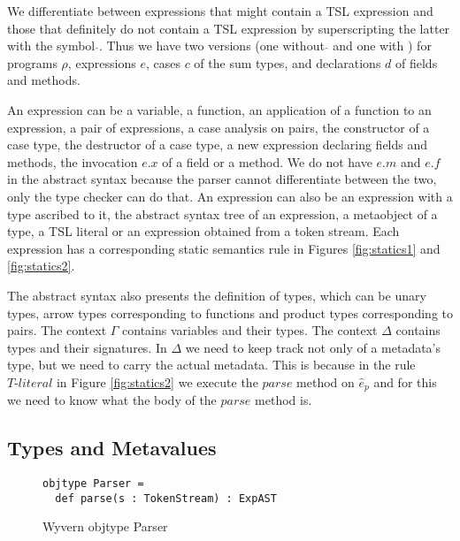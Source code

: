 We differentiate between expressions that might contain a TSL expression and those that definitely do not contain a TSL expression by superscripting the latter with the symbol $\hat{}$. Thus we have two versions (one without $\hat{}$ and one with $\hat{}$) for programs $\rho$,  expressions $e$, cases $c$ of the sum types, and declarations $d$ of fields and methods. 

An expression can be a variable, a function, an application of a function to an expression, a pair of expressions, a case analysis on pairs, the constructor of a case type, the destructor of a case type, a new expression declaring fields and methods, the invocation $e.x$ of a field or a method. We do not have $e.m$ and $e.f$ in the abstract syntax because the parser cannot differentiate between the two, only the type checker can do that. An expression can also be an expression with a type ascribed to it, the abstract syntax tree of an expression, a metaobject of a type, a TSL literal or an expression obtained from a token stream. Each expression has a corresponding static semantics rule in Figures \ref{fig:statics1} and \ref{fig:statics2}. 

The abstract syntax also presents the definition of types, which can be unary types, arrow types corresponding to functions and product types corresponding to pairs. The context $\Gamma$ contains variables and their types. The context $\Delta$ contains types and their signatures. In $\Delta$ we need to keep track not only of a metadata's type, but we need to carry the actual metadata. This is because in the rule $\textit{T-literal}$ in Figure \ref{fig:statics2} we execute the $parse$ method on $\hat{e}_p$ and for this we need to know what the body of the $parse$ method is.


\subsection{Types and Metavalues}



\begin{figure}
\begin{lstlisting}
objtype Parser = 
  def parse(s : TokenStream) : ExpAST
\end{lstlisting}
\caption{Wyvern objtype Parser}
\label{fig:typeParser}
\end{figure}

